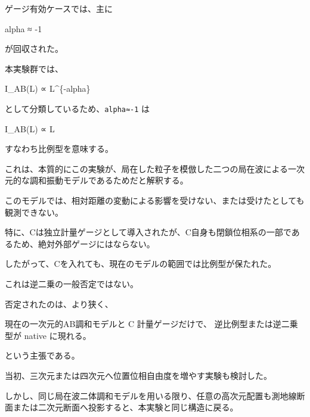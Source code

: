 \documentclass[
]{article}
\newenvironment{Shaded}{}{}
\newcommand{\NormalTok}[1]{#1}
\begin{document}
ゲージ有効ケースでは、主に

\begin{Shaded}
\begin{Highlighting}[]
\NormalTok{alpha ≈ {-}1}
\end{Highlighting}
\end{Shaded}

が回収された。

本実験群では、

\begin{Shaded}
\begin{Highlighting}[]
\NormalTok{I\_AB(L) ∝ L\^{}\{{-}alpha\}}
\end{Highlighting}
\end{Shaded}

として分類しているため、\texttt{alpha≈-1} は

\begin{Shaded}
\begin{Highlighting}[]
\NormalTok{I\_AB(L) ∝ L}
\end{Highlighting}
\end{Shaded}

すなわち比例型を意味する。

これは、本質的にこの実験が、局在した粒子を模倣した二つの局在波による一次元的な調和振動モデルであるためだと解釈する。

このモデルでは、相対距離の変動による影響を受けない、または受けたとしても観測できない。

特に、Cは独立計量ゲージとして導入されたが、C自身も閉鎖位相系の一部であるため、絶対外部ゲージにはならない。

したがって、Cを入れても、現在のモデルの範囲では比例型が保たれた。

これは逆二乗の一般否定ではない。

否定されたのは、より狭く、

\begin{Shaded}
\begin{Highlighting}[]
\NormalTok{現在の一次元的AB調和モデルと C 計量ゲージだけで、}
\NormalTok{逆比例型または逆二乗型が native に現れる。}
\end{Highlighting}
\end{Shaded}

という主張である。

当初、三次元または四次元へ位置位相自由度を増やす実験も検討した。

しかし、同じ局在波二体調和モデルを用いる限り、任意の高次元配置も測地線断面または二次元断面へ投影すると、本実験と同じ構造に戻る。
\end{document}
